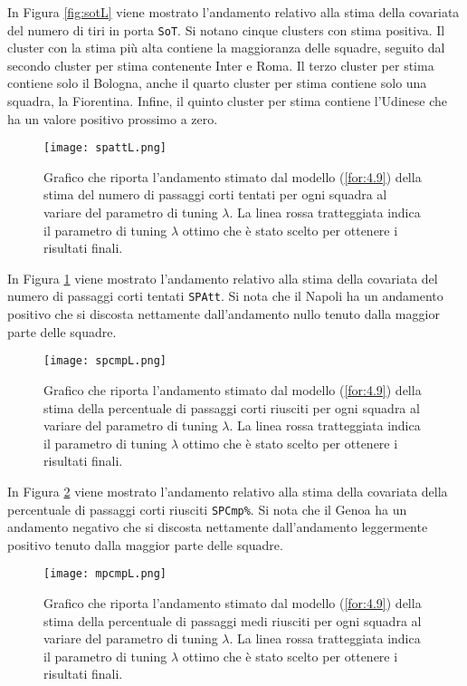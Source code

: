 In Figura \ref{fig:sotL} viene mostrato l'andamento relativo alla stima della covariata del numero di tiri in porta \texttt{SoT}. Si notano cinque clusters con stima positiva. Il cluster con la stima più alta contiene la maggioranza delle squadre, seguito dal secondo cluster per stima contenente Inter e Roma. Il terzo cluster per stima contiene solo il Bologna, anche il quarto cluster per stima contiene solo una squadra, la Fiorentina. Infine, il quinto cluster per stima contiene l'Udinese che ha un valore positivo prossimo a zero.

\begin{figure}[htbp]
	\begin{center}
		\texttt{[image: spattL.png]}
		\caption{Grafico che riporta l'andamento stimato dal modello (\ref{for:4.9}) della stima del numero di passaggi corti tentati per ogni squadra al variare del parametro di tuning $\lambda$. La linea rossa tratteggiata indica il parametro di tuning $\lambda$ ottimo che è stato scelto per ottenere i risultati finali.} \label{fig:spattL}
	\end{center}
\end{figure}

In Figura \ref{fig:spattL} viene mostrato l'andamento relativo alla stima della covariata del numero di passaggi corti tentati \texttt{SPAtt}. Si nota che il Napoli ha un andamento positivo che si discosta nettamente dall'andamento nullo tenuto dalla maggior parte delle squadre.

\begin{figure}[htbp]
	\begin{center}
		\texttt{[image: spcmpL.png]}
		\caption{Grafico che riporta l'andamento stimato dal modello (\ref{for:4.9}) della stima della percentuale di passaggi corti riusciti per ogni squadra al variare del parametro di tuning $\lambda$. La linea rossa tratteggiata indica il parametro di tuning $\lambda$ ottimo che è stato scelto per ottenere i risultati finali.} \label{fig:spcmpL}
	\end{center}
\end{figure}

In Figura \ref{fig:spcmpL} viene mostrato l'andamento relativo alla stima della covariata della percentuale di passaggi corti riusciti \texttt{SPCmp\%}. Si nota che il Genoa ha un andamento negativo che si discosta nettamente dall'andamento leggermente positivo tenuto dalla maggior parte delle squadre.

\begin{figure}[htbp]
	\begin{center}
		\texttt{[image: mpcmpL.png]}
		\caption{Grafico che riporta l'andamento stimato dal modello (\ref{for:4.9}) della stima della percentuale di passaggi medi riusciti per ogni squadra al variare del parametro di tuning $\lambda$. La linea rossa tratteggiata indica il parametro di tuning $\lambda$ ottimo che è stato scelto per ottenere i risultati finali.} \label{fig:mpcmpL}
	\end{center}
\end{figure}

